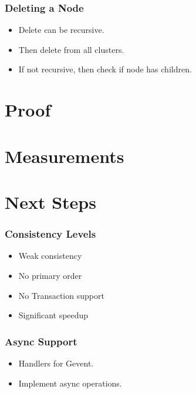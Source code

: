 \documentclass[10pt, compress]{beamer}
\begin{document}
\begin{frame}[fragile]
    \frametitle{Deleting a Node}
    \begin{itemize}
        \item Delete can be recursive.
        \item Then delete from all clusters.
        \item If not recursive, then check if node has children.
    \end{itemize}
\end{frame}

\section{Proof}
\begin{frame}
\end{frame}

\section{Measurements}
\begin{frame}
\end{frame}

\section{Next Steps}
\begin{frame}[fragile]
    \frametitle{Consistency Levels}
    \begin{itemize}
        \item Weak consistency
        \item No primary order
        \item No Transaction support
        \item Significant speedup
    \end{itemize}
\end{frame}

\begin{frame}
    \frametitle{Async Support}
    \begin{itemize}
        \item Handlers for Gevent.
        \item Implement async operations.
    \end{itemize}

\end{frame}



\end{document}
